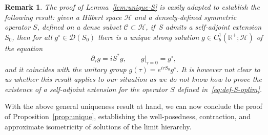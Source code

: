 \documentclass[a4paper,11pt,reqno,noindent]{amsart}
\theoremstyle{plain}
\newtheorem{rem}[lem]{Remark}
\numberwithin{equation}{section}
\newcommand{\R}{\mathbb R}
\newcommand{\Dc}{\mathcal D}
\newcommand{\Cc}{\mathcal C}
\newcommand{\Hc}{\mathcal H}
\newcommand{\3}{|\!|\!|}
\begin{document}
\begin{rem}
The proof of Lemma~\ref{lem:unique-S} is easily adapted to establish the following result: given a Hilbert space $\Hc$ and a densely-defined symmetric operator $S$, defined on a dense subset $\Cc\subset\Hc$, if~$S$ admits a self-adjoint extension $S_0$, then for all $g^\circ\in\Dc(S_0)$ there is a unique strong solution $g\in C^1_b(\R^+;\Hc)$ of the equation
\begin{equation*}
\partial_\tau g=iS^*g,\qquad g|_{\tau=0}=g^\circ,
\end{equation*}
and it coincides with the unitary group $g(\tau)=e^{i\tau S_0}g^\circ$.
It is however not clear to us whether this result applies to our situation as we do not know how to prove the existence of a self-adjoint extension for the operator $S$ defined in~\eqref{eq:def-S-oplim}.
\end{rem}

With the above general uniqueness result at hand, we can now conclude the proof of Proposition~\ref{prop:unique}, establishing the well-posedness, contraction, and approximate isometricity of solutions of the limit hierarchy.
\end{document}
